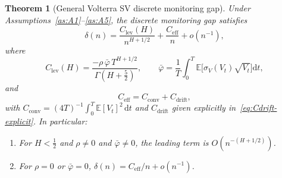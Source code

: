 \documentclass[12pt]{article}
\newtheorem{theorem}{Theorem}
\theoremstyle{definition}
\newcommand{\E}{\mathbb{E}}
\newcommand{\dd}{\mathrm{d}}
\begin{document}
\begin{theorem}[General Volterra SV discrete monitoring gap]
\label{thm:general}
Under Assumptions~\ref{as:A1}--\ref{as:A5},
the discrete monitoring gap satisfies
\begin{equation}\label{eq:general-expansion}
  \delta(n)
  = \frac{C_{\mathrm{lev}}(H)}{n^{H+1/2}}
  + \frac{C_{\mathrm{eff}}}{n}
  + o(n^{-1}),
\end{equation}
where
\begin{equation}\label{eq:Clev-general}
  C_{\mathrm{lev}}(H)
  = \frac{-\rho\,\bar\varphi\, T^{H+1/2}}
         {\Gamma(H+\tfrac52)},
  \qquad
  \bar\varphi = \frac{1}{T}\int_0^T
    \E\bigl[\sigma_V(V_t)\sqrt{V_t}\bigr]\dd t,
\end{equation}
and
\begin{equation}\label{eq:Ceff}
  C_{\mathrm{eff}} = C_{\mathrm{conv}} + C_{\mathrm{drift}},
\end{equation}
with $C_{\mathrm{conv}} = (4T)^{-1}\!\int_0^T\!\E[V_t]^2\,\dd t$
and $C_{\mathrm{drift}}$ given explicitly in~\eqref{eq:Cdrift-explicit}.
In particular:
\begin{enumerate}[label=(\roman*)]
\item For $H < \tfrac12$ and $\rho \neq 0$ and $\bar\varphi \neq 0$,
  the leading term is $O(n^{-(H+1/2)})$.
\item For $\rho = 0$ or $\bar\varphi = 0$,
  $\delta(n) = C_{\mathrm{eff}}/n + o(n^{-1})$.
\end{enumerate}
\end{theorem}
\end{document}
